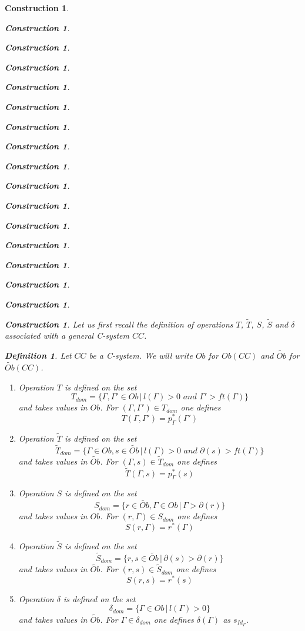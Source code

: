 \documentclass[12pt]{amsart}
\newtheorem{definition}[proposition]{Definition}
\newtheorem{construction}[proposition]{Construction}
\newcommand{\llabel}[1]{\label{#1}}
\newcommand{\wt}{\widetilde}
\begin{document}
\begin{construction}
\begin{construction}
\begin{construction}
\begin{construction}
\begin{construction}
\begin{construction}
\begin{construction}
\begin{construction}
\begin{construction}
\begin{construction}
\begin{construction}
\begin{construction}
\begin{construction}
\begin{construction}
\begin{construction}
\begin{construction}
\begin{construction}
Let us first recall the definition of operations $T$, $\wt{T}$, $S$, $\wt{S}$
and $\delta$ associated with a general C-system $CC$.
%
\begin{definition}
\llabel{2015.08.26.def1}
Let $CC$ be a C-system. We will write $Ob$ for $Ob(CC)$ and $\wt{Ob}$ for $\wt{Ob}(CC)$. 
%
%
\begin{enumerate}
\item Operation $T$ is defined on the set
%
$$T_{dom}=\{\Gamma,\Gamma'\in Ob\,|\,l(\Gamma)>0\,\,and\,\, \Gamma'>ft(\Gamma)\}$$
%
and takes values in $Ob$. For $(\Gamma,\Gamma')\in T_{dom}$ one defines
%
$$T(\Gamma,\Gamma')=p_{\Gamma}^*(\Gamma')$$
%
\item Operation $\wt{T}$ is defined on the set
%
$$\wt{T}_{dom}=\{\Gamma\in Ob, s\in \wt{Ob}\,|\,l(\Gamma)>0\,\,and\,\, \partial(s)>ft(\Gamma)\}$$
%
and takes values in $\wt{Ob}$. For $(\Gamma,s)\in \wt{T}_{dom}$ one defines
%
$$\wt{T}(\Gamma,s)=p_{\Gamma}^*(s)$$
%
\item Operation $S$ is defined on the set
%
$$S_{dom}=\{r\in \wt{Ob}, \Gamma\in Ob\,|\,\Gamma>\partial(r)\}$$
%
and takes values in $Ob$. For $(r,\Gamma)\in S_{dom}$ one defines
%
$$S(r,\Gamma)=r^*(\Gamma)$$
%
\item Operation $\wt{S}$ is defined on the set 
%
$$\wt{S}_{dom}=\{r,s\in \wt{Ob}\,|\,\partial(s)>\partial(r)\}$$
%
and takes values in $\wt{Ob}$. For $(r,s)\in \wt{S}_{dom}$ one defines
%
$$S(r,s)=r^*(s)$$
%
\item Operation $\delta$ is defined on the set 
%
$$\delta_{dom}=\{\Gamma\in Ob\,|\,l(\Gamma)>0\}$$
%
and takes values in $\wt{Ob}$. For $\Gamma\in \delta_{dom}$ one defines $\delta(\Gamma)$ as $s_{Id_{\Gamma}}$. 
\end{enumerate}
\end{definition}
%


\end{construction}
\end{construction}
\end{construction}
\end{construction}
\end{construction}
\end{construction}
\end{construction}
\end{construction}
\end{construction}
\end{construction}
\end{construction}
\end{construction}
\end{construction}
\end{construction}
\end{construction}
\end{construction}
\end{construction}
\end{document}
